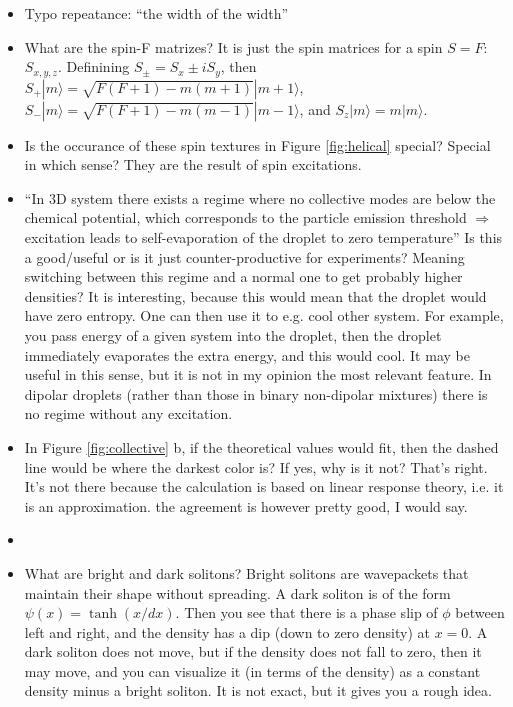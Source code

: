 \begin{itemize}
    \item Typo repeatance: ``the width of the width''

    \item What are the spin-F matrizes?
        {\color{red} It is just the spin matrices for a spin
        $S=F$: $S_{x,y,z}$. Definining $S_{\pm} = S_x\pm iS_y$,
        then $S_+ |m\rangle = \sqrt{F(F+1)-m(m+1)}|m+1\rangle$,  $S_- |m\rangle = \sqrt{F(F+1)-m(m-1)}|m-1\rangle$, and $S_z |m\rangle = m|m\rangle$.
        }

    \item Is the occurance of these spin textures in Figure \ref{fig:helical} special?
    {\color{red} Special in which sense? They are the result of spin excitations.}

    \item ``In 3D system there exists a regime where no collective modes are below the chemical potential,
        which corresponds to the particle emission threshold $\Rightarrow$ excitation leads to self-evaporation of the droplet to
        zero temperature'' Is this a good/useful or is it just counter-productive for experiments?
        Meaning switching between this regime and a normal one to get probably higher densities?
    {\color{red}
    It is interesting, because this would mean that the droplet would have zero entropy.
    One can then use it to e.g. cool other system. For example, you pass energy of a given system into the droplet,
    then the droplet immediately evaporates the extra energy, and this would cool. It may be useful in this sense,
    but it is not in my opinion the most relevant feature. In dipolar droplets
    (rather than those in binary non-dipolar mixtures) there is no regime without any excitation.
    }

    \item In Figure \ref{fig:collective} b, if the theoretical values would fit,
        then the dashed line would be where the darkest color is? If yes, why is it not?
    {\color{red}
        That's right. It's not there because the calculation is based on linear response theory,
        i.e. it is an approximation. the agreement is however pretty good, I would say.
    }

    \item \item What are bright and dark solitons?
    {\color{red}
        Bright solitons are wavepackets that maintain their shape without spreading.
        A dark soliton is of the form $\psi(x) = \tanh(x/dx)$.
        Then you see that there is a phase slip of $\phi$ between left and right, and the density has a dip
        (down to zero density) at $x=0$. A dark soliton does not move, but if the density does not fall to zero,
        then it may move, and you can visualize it (in terms of the density)
        as a constant density minus a bright soliton. It is not exact, but it gives you a rough idea.
    }


\end{itemize}

